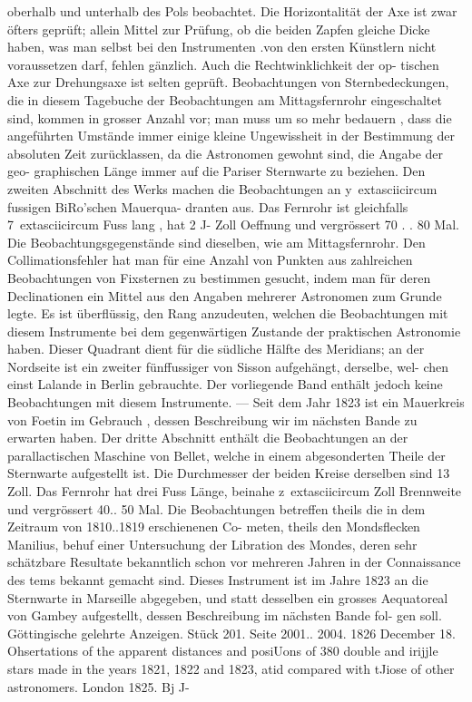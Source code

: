 \documentclass[12pt,a4paper]{article}
\begin{document}
{{{{{{{{oberhalb  und  unterhalb  des  Pols  beobachtet.  Die  Horizontalität  der  Axe  ist  zwar  öfters  geprüft;  allein Mittel  zur  Prüfung,  ob  die  beiden  Zapfen  gleiche  Dicke  haben,  was  man  selbst  bei  den  Instrumenten .von  den  ersten  Künstlern  nicht  voraussetzen  darf,  fehlen  gänzlich.  Auch  die  Rechtwinklichkeit  der  op- tischen Axe  zur  Drehungsaxe  ist  selten  geprüft.  Beobachtungen  von  Sternbedeckungen,  die  in  diesem Tagebuche  der  Beobachtungen  am  Mittagsfernrohr  eingeschaltet  sind,  kommen  in  grosser  Anzahl  vor; man  muss  um  so  mehr  bedauern ,  dass  die  angeführten  Umstände  immer  einige  kleine  Ungewissheit  in der  Bestimmung  der  absoluten  Zeit  zurücklassen,  da  die  Astronomen  gewohnt  sind,  die  Angabe  der  geo- graphischen Länge  immer  auf  die  Pariser  Sternwarte  zu  beziehen. Den  zweiten  Abschnitt  des  Werks  machen  die  Beobachtungen  an  y\	extasciicircum{}{ }fussigen  BiRo'schen  Mauerqua- dranten aus.  Das  Fernrohr  ist  gleichfalls  7\	extasciicircum{}{ }  Fuss  lang ,  hat  2  J-  Zoll  Oeffnung  und  vergrössert  70 . .  80 Mal.  Die  Beobachtungsgegenstände  sind  dieselben,  wie  am  Mittagsfernrohr.  Den  Collimationsfehler  hat man  für  eine  Anzahl  von  Punkten  aus  zahlreichen  Beobachtungen  von  Fixsternen  zu  bestimmen  gesucht, indem  man  für  deren  Declinationen  ein  Mittel  aus  den  Angaben  mehrerer  Astronomen  zum  Grunde  legte. Es  ist  überflüssig,  den  Rang  anzudeuten,  welchen  die  Beobachtungen  mit  diesem  Instrumente  bei  dem gegenwärtigen  Zustande  der  praktischen  Astronomie  haben.  Dieser  Quadrant  dient  für  die  südliche Hälfte  des  Meridians;  an  der  Nordseite  ist  ein  zweiter  fünffussiger  von  Sisson  aufgehängt,  derselbe,  wel- chen einst  Lalande  in  Berlin  gebrauchte.  Der  vorliegende  Band  enthält  jedoch  keine  Beobachtungen mit  diesem  Instrumente.  ---  Seit  dem  Jahr  1823  ist  ein  Mauerkreis  von  Foetin  im  Gebrauch ,  dessen Beschreibung  wir  im  nächsten  Bande  zu  erwarten  haben. Der  dritte  Abschnitt  enthält  die  Beobachtungen  an  der  parallactischen  Maschine  von  Bellet, welche  in  einem  abgesonderten  Theile  der  Sternwarte  aufgestellt  ist.  Die  Durchmesser  der  beiden  Kreise derselben  sind  13  Zoll.  Das  Fernrohr  hat  drei  Fuss  Länge,  beinahe  z\	extasciicircum{}{ }  Zoll  Brennweite  und  vergrössert 40.. 50  Mal.  Die  Beobachtungen  betreffen  theils  die  in  dem  Zeitraum  von  1810..1819  erschienenen  Co- meten,  theils  den  Mondsflecken  Manilius,  behuf  einer  Untersuchung  der  Libration  des  Mondes,  deren sehr  schätzbare  Resultate  bekanntlich  schon  vor  mehreren  Jahren  in  der  Connaissance  des  tems  bekannt gemacht  sind.  Dieses  Instrument  ist  im  Jahre  1823  an  die  Sternwarte  in  Marseille  abgegeben,  und  statt desselben  ein  grosses  Aequatoreal  von  Gambey  aufgestellt,  dessen  Beschreibung  im  nächsten  Bande  fol- gen soll. Göttingische  gelehrte  Anzeigen.     Stück  201.     Seite  2001.. 2004.     1826  December  18. Ohsertations  of  the  apparent  distances  and  posiUons  of  380  double  and  irijjle  stars  made  in  the  years 1821,  1822  and  1823,  atid  compared  with  tJiose  of  other  astronomers.  London  1825.  Bj  J- }}}}}}}}
\end{document}
